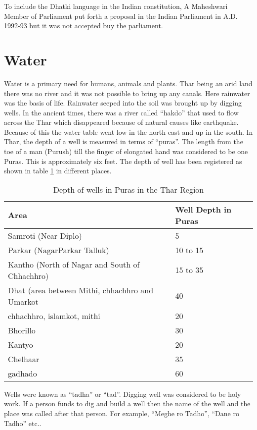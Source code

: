 To include the Dhatki language in the Indian constitution, A Maheshwari Member of Parliament put forth a proposal in the Indian Parliament in A.D. 1992-93 but it was not accepted buy the parliament.

\section{Water}
Water is a primary need for humans, animals and plants. Thar being an arid land there was no river and it was not possible to bring up any canals. Here rainwater was the basis of life. Rainwater seeped into the soil was brought up by digging wells. In the ancient times, there was a river called ``hakdo'' that used to flow across the Thar which disappeared because of natural causes like earthquake. Because of this the water table went low in the north-east and up in the south. In Thar, the depth of a well is measured in terms of ``puras''. The length from the toe of a man (Purush) till the finger of elongated hand was considered to be one Puras. This is approximately six feet. The depth of well has been registered as shown in table \ref{tbl:well} in different places.
\begin{table}
\begin{center}
\begin{tabular}{l|l}
\hline
\textbf{Area} & \textbf{Well Depth in Puras} \\
\hline
Samroti (Near Diplo) & 5 \\ 
Parkar (NagarParkar Talluk) & 10 to 15 \\ 
Kantho (North of Nagar and South of Chhachhro) & 15 to 35 \\ 
Dhat (area between Mithi, chhachhro and Umarkot & 40 \\ 
chhachhro, islamkot, mithi & 20 \\ 
Bhorillo & 30 \\ 
Kantyo & 20 \\ 
Chelhaar & 35 \\ 
gadhado & 60 \\ 
\hline
\end{tabular}
\end{center}
\caption{Depth of wells in Puras in the Thar Region}
\label{tbl:well}
\end{table}

Wells were known as ``tadha'' or ``tad''. Digging well was considered to be holy work. If a person funds to dig and build a well then the name of the well and the place was called after that person. For example, ``Meghe ro Tadho'', ``Dane ro Tadho'' etc..

